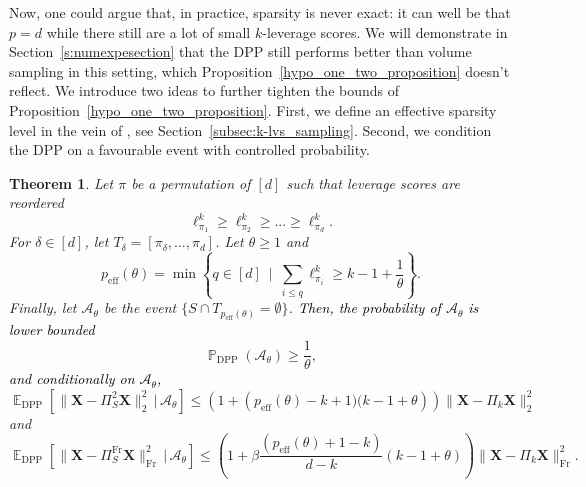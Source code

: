 \documentclass[twoside,11pt]{book}
\newcommand{\rev}[1]{\textcolor{black}{#1}}
\newtheorem{theorem}{Theorem}
\numberwithin{theorem}{chapter}
\numberwithin{definition}{chapter}
\numberwithin{proposition}{chapter}
\numberwithin{corollary}{chapter}
\numberwithin{example}{chapter}
\numberwithin{lemma}{chapter}
\numberwithin{assumption}{chapter}
\numberwithin{equation}{chapter}
\numberwithin{figure}{chapter}
\DeclareMathOperator{\Fr}{\mathrm{Fr}}
\DeclareMathOperator{\DPP}{\mathrm{DPP}}
\DeclareMathOperator{\eff}{\mathrm{eff}}
\DeclareMathOperator{\EX}{\mathbb{E}}
\DeclareMathOperator{\Prb}{\mathbb{P}}
\begin{document}
Now, one could argue that, in practice, sparsity is never exact: it can well be that $p = d$ while there still are a lot of small $k$-leverage scores. We will demonstrate in Section~\ref{s:numexpesection} that the DPP still performs better than volume sampling in this setting, which Proposition~\ref{hypo_one_two_proposition} doesn't reflect. We introduce two ideas to further tighten the bounds of Proposition~\ref{hypo_one_two_proposition}. First, we define an effective sparsity level in the vein of \cite{PaKyBo14}, see Section~\ref{subsec:k-lvs_sampling}. Second, we condition the DPP on a favourable event with controlled probability.
\begin{theorem}\label{prop:p_eff_proposition}
    Let $\pi$ be a permutation of $[d]$ such that leverage scores are reordered
    \begin{equation}
        \ell_{\pi_{1}}^{k}\geq \ell_{\pi_{2}}^{k} \geq ... \geq \ell_{\pi_{d}}^{k}.
    \end{equation}
    For $\delta \in [d]$, let $T_{\delta} = [\pi_{\delta},\dots,\pi_{d}]$. Let $\theta \geq 1$ and
    \begin{equation}\label{eq:leverage_score_decreasing_hypo}
    p_{\eff}(\theta) = \min\left\{q\in[d] ~\mid~ \sum\limits_{i \leq q} \ell_{\pi_{i}}^{k} \geq k -1+\frac{1}{\theta}\right\}.
    \end{equation}
    Finally, let $\mathcal{A}_\theta$ be the event $\{S \cap T_{p_{\eff}(\theta)} = \emptyset\}$. \rev{Then, the probability of  $\mathcal{A}_{\theta}$ is lower bounded}
    \begin{equation}\label{eq:rejection_probability}
        \Prb_{\DPP}\left( \mathcal{A}_\theta\right) \geq \frac{1}{\theta},
    \end{equation}
    \rev{and conditionally on $\mathcal{A}_{\theta}$,}
    \begin{equation}
    \EX_{\DPP} \left[ \| \bm{X} - \Pi_{S}^{2}\bm{X} \|_{2}^{2} \, \big| \, \mathcal{A}_\theta \right] \leq (1+\left(p_{\eff}(\theta)-k+1)(k-1+\theta \right))\| \bm{X} - \Pi_{k}\bm{X} \|_{2}^{2}
    \end{equation}
    and
    \begin{equation}
    	\label{eq:boundFrobenius_assumpt2}
    	\EX_{\DPP} \left[ \| \bm{X} - \Pi_{S}^{\Fr}\bm{X} \|_{\Fr}^{2} \, \big| \, \mathcal{A}_\theta\right] \leq \left(1+				\beta\frac{(p_{\eff}(\theta)+1-k)}{d-k}(k-1+\theta) \right)\| \bm{X} - \Pi_{k}\bm{X} \|_{\Fr}^{2}.
    \end{equation}
\end{theorem}
\end{document}
